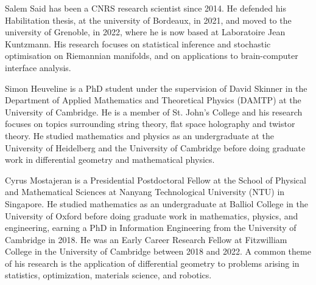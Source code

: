 \documentclass[draftclsnofoot]{IEEEtran}
\begin{document}




\begin{IEEEbiographynophoto}{Salem Said}
has been a CNRS research scientist since 2014. He defended his Habilitation thesis, at the university of Bordeaux, in 2021, and moved to the university of Grenoble, in 2022, where he is now based at Laboratoire Jean Kuntzmann. His research focuses on statistical inference and stochastic optimisation on Riemannian manifolds, and on applications to brain-computer interface analysis.
\end{IEEEbiographynophoto}
\begin{IEEEbiographynophoto}{Simon Heuveline}
is a PhD student under the supervision of David Skinner in the Department of Applied Mathematics and Theoretical Physics (DAMTP) at the University of Cambridge. He is a member of St. John's College and his research focuses on topics surrounding string theory, flat space holography and twistor theory. He studied mathematics and physics as an undergraduate at the University of Heidelberg and the University of Cambridge before doing graduate work in differential geometry and mathematical physics. 
\end{IEEEbiographynophoto}
\begin{IEEEbiographynophoto}{Cyrus Mostajeran}
is a Presidential Postdoctoral Fellow at the School of Physical and Mathematical Sciences at Nanyang Technological University (NTU) in Singapore. He studied mathematics as an undergraduate at Balliol College in the University of Oxford before doing graduate work in mathematics, physics, and engineering, earning a PhD in Information Engineering from the University of Cambridge in 2018. He was an Early Career Research Fellow at Fitzwilliam College in the University of Cambridge between 2018 and 2022.  A common theme of his research is the application of differential geometry to problems arising in statistics, optimization, materials science, and robotics.
\end{IEEEbiographynophoto}    
\end{document}
